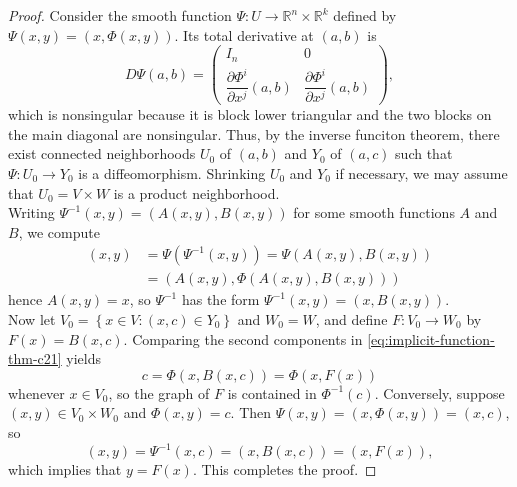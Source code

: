 \documentclass[reqno]{amsart}
\theoremstyle{plain}%
\theoremstyle{definition}
\theoremstyle{remark}
\begin{document}
        \begin{proof}
        Consider the smooth function $\Psi  \colon U \to \mathbb{R}^{n} \times
        \mathbb{R}^{k}$ defined by
        $\Psi (x,y) = \left( x, \Phi(x,y) \right) $. Its total derivative at
        $(a,b)$ is
        \[
        D \Psi (a,b) = 
        \begin{pmatrix} 
            I_n & 0\\
            \dfrac{\partial \Phi^{i}}{\partial x^{j}}(a,b) & \dfrac{\partial
            \Phi^{i}}{\partial x^{j}} (a,b)
        \end{pmatrix},
        \] 
        which is nonsingular because it is block lower triangular and the two
        blocks on the main diagonal are nonsingular. 
        Thus, by the inverse funciton theorem, there exist connected neighborhoods
        $U_0$ of $(a,b)$ and $Y_0$ of $(a,c)$ such that
        $\Psi  \colon U_0 \to Y_0$ is a diffeomorphism. Shrinking
        $U_0$ and $Y_0$ if necessary, we may assume that
        $U_0 = V \times W$ is a product neighborhood.\\
        Writing $\Psi^{-1}(x,y) = \left( A(x,y), B(x,y) \right) $ for some smooth
        functions $A$ and $B$, we compute
        \begin{align*}
            (x,y)
            &= \Psi \left( \Psi^{-1}(x,y) \right) = \Psi \left( A(x,y), B(x,y)
            \right) \\
            &= \left( A(x,y), \Phi \left( A(x,y), B(x,y) \right)  \right) \tag{$\omega $}
            \label{eq:implicit-function-thm-c21}
        \end{align*}
        hence $A(x,y) = x$, so $\Psi^{-1}$ has the form
        $\Psi^{-1}(x,y) = \left( x, B(x,y) \right) $.\\
        Now let $V_0 = \left\{ x \in V  \colon
        \left( x,c \right)  \in Y_0 \right\} $ and
        $W_0 = W$, and define $F  \colon V_0 \to W_0$ by
        $F(x) = B(x,c)$. Comparing the second components in
        \eqref{eq:implicit-function-thm-c21} yields
        \[
        c   = \Phi \left( x, B(x,c) \right) = \Phi \left( x, F(x) \right) 
        \] 
        whenever $x \in V_0$, so the graph of $F$ is contained in
        $\Phi^{-1}(c)$. Conversely, suppose
        $\left( x,y \right) \in V_0 \times W_0$ and
        $\Phi(x,y) = c$. Then $\Psi(x,y) = 
        \left( x, \Phi (x,y) \right) = (x,c)$, so
        \[
            (x,y) = \Psi^{-1}\left( x,c \right) =
            \left( x, B(x,c) \right) =
            (x,F(x)),
        \] 
        which implies that $y = F(x)$. This completes the proof.
        \end{proof}









 
\end{document}
